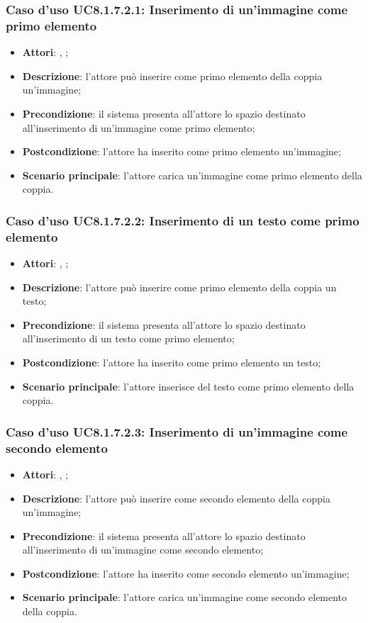 		\subsubsection{Caso d'uso UC8.1.7.2.1: Inserimento di un'immagine come primo elemento}
		\begin{itemize}
			\item \textbf{Attori}: \uau, \uaupro;
			\item \textbf{Descrizione}: l'attore può inserire come primo elemento della coppia un'immagine;
			\item \textbf{Precondizione}: il sistema presenta all'attore lo spazio destinato all'inserimento di un'immagine come primo elemento;
			\item \textbf{Postcondizione}: l'attore ha inserito come primo elemento un'immagine;
			\item \textbf{Scenario principale}: l'attore carica un'immagine come primo elemento della coppia.
		\end{itemize}
		
		\subsubsection{Caso d'uso UC8.1.7.2.2: Inserimento di un testo come primo elemento}
		\begin{itemize}
			\item \textbf{Attori}: \uau, \uaupro;
			\item \textbf{Descrizione}: l'attore può inserire come primo elemento della coppia un testo;
			\item \textbf{Precondizione}: il sistema presenta all'attore lo spazio destinato all'inserimento di un testo come primo elemento;
			\item \textbf{Postcondizione}: l'attore ha inserito come primo elemento un testo;
			\item \textbf{Scenario principale}: l'attore inserisce del testo come primo elemento della coppia.
		\end{itemize}
		
			\subsubsection{Caso d'uso UC8.1.7.2.3: Inserimento di un'immagine come secondo elemento}
		\begin{itemize}
			\item \textbf{Attori}: \uau, \uaupro;
			\item \textbf{Descrizione}: l'attore può inserire come secondo elemento della coppia un'immagine;
			\item \textbf{Precondizione}: il sistema presenta all'attore lo spazio destinato all'inserimento di un'immagine come secondo elemento;
			\item \textbf{Postcondizione}: l'attore ha inserito come secondo elemento un'immagine;
			\item \textbf{Scenario principale}: l'attore carica un'immagine come secondo elemento della coppia.
		\end{itemize}
		
